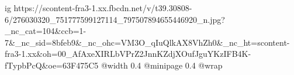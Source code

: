  
 
 
 
 

\ifcmt
  ig https://scontent-fra3-1.xx.fbcdn.net/v/t39.30808-6/276030320_751777599127114_797507894655446920_n.jpg?_nc_cat=104&ccb=1-7&_nc_sid=8bfeb9&_nc_ohc=VM3O_qIuQlkAX8VhZh0&_nc_ht=scontent-fra3-1.xx&oh=00_AfAxeXIRLbVPrZ2JnnKZdjXOufJguYKzIFB4K-fTypbPcQ&oe=63F475C5
  @width 0.4
  @minipage 0.4
  @wrap \parpic[r]
\fi
